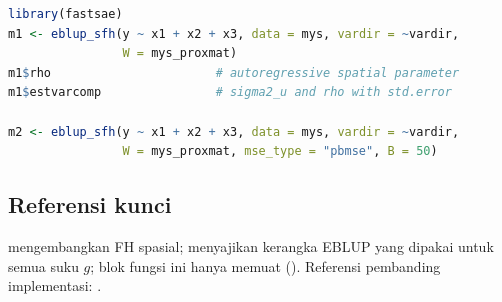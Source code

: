 \begin{lstlisting}[language=R,caption={Contoh yang dapat dijalankan (dari \texttt{man/eblup\_sfh.Rd}).}]
library(fastsae)
m1 <- eblup_sfh(y ~ x1 + x2 + x3, data = mys, vardir = ~vardir,
                W = mys_proxmat)
m1$rho                       # autoregressive spatial parameter
m1$estvarcomp                # sigma2_u and rho with std.error

m2 <- eblup_sfh(y ~ x1 + x2 + x3, data = mys, vardir = ~vardir,
                W = mys_proxmat, mse_type = "pbmse", B = 50)
\end{lstlisting}

\subsection{Referensi kunci}\label{sec:sfh-ref}

\citet{pratesi2008small} mengembangkan FH spasial; \citet{rao2015small}
menyajikan kerangka EBLUP yang dipakai untuk semua suku $g$;
blok  fungsi ini hanya memuat \citet{rao2015small}
(). Referensi pembanding implementasi:
 \citep{molina2015sae}.
